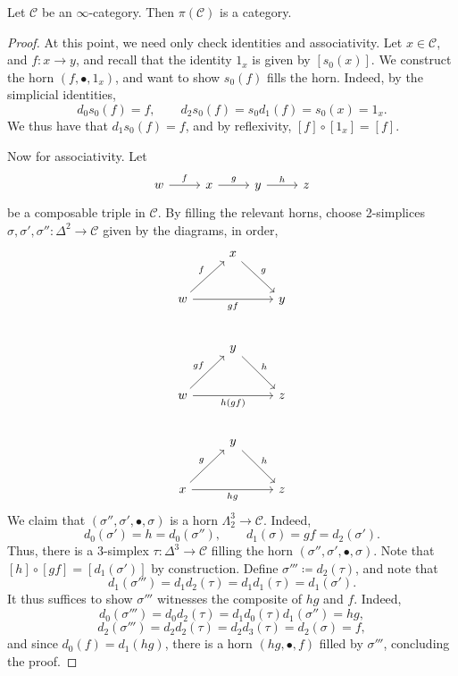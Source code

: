 \begin{proposition}\label{1.2.3.10}
	Let $\mathcal{C} $ be an $\infty $-category. Then $\pi (\mathcal{C} )$ is a category.
\end{proposition}
\begin{proof}
	At this point, we need only check identities and associativity. Let $x\in \mathcal{C} $, and $f : x \to y$, and recall that the identity $1_x$ is given by $[s_0(x)]$. We construct the horn $(f,\bullet,1_x)$, and want to show $s_0(f)$ fills the horn. Indeed, by the simplicial identities,
	\[
		d_0s_0(f)=f,\qquad d_2s_0(f)=s_0d_1(f)=s_0(x)=1_x
	.\]
	We thus have that $d_1s_0(f)=f$, and by reflexivity, $[f]\circ [1_x]=[f]$.

	Now for associativity. Let
	\[\begin{tikzcd}[row sep = 2.5em, column sep = 2.5em]
	w \ar[" f ", r]  & x \ar[" g ", r]  & y \ar[" h ", r]  & z
	\end{tikzcd}\]
	be a composable triple in $\mathcal{C} $. By filling the relevant horns, choose 2-simplices $\sigma ,\sigma ',\sigma '' : \Delta ^2 \to \mathcal{C} $ given by the diagrams, in order,
	\[\begin{tikzcd}[row sep = 2.5em, column sep = 2.5em]
	 & x \ar[" g ", dr]  &  \\
	w \ar[" f ", ur] \ar[" gf "', rr]  &  & y \\
	 & y \ar[" h ", dr]  &  \\
	w \ar[" gf ", ur] \ar[" h(gf) "', rr]  &  & z \\
	 & y \ar[" h ", dr]  &  \\
	x \ar[" g ", ur] \ar[" hg "', rr]  &  & z
	\end{tikzcd}\]
	We claim that $(\sigma'',\sigma ',\bullet,\sigma )$ is a horn $\Lambda ^3_2 \to \mathcal{C} $. Indeed,
	\[
		d_0(\sigma ')=h=d_0(\sigma ''),\qquad d_1(\sigma )=gf=d_2(\sigma ')
	.\]
	Thus, there is a 3-simplex $\tau : \Delta ^3 \to \mathcal{C} $ filling the horn $(\sigma '',\sigma ',\bullet,\sigma )$. Note that $[h]\circ [gf]=[d_1(\sigma ')]$ by construction. Define $\sigma ''' \coloneqq d_2(\tau )$, and note that
	\[
		d_1(\sigma ''')=d_1d_2(\tau )=d_1d_1(\tau )=d_1(\sigma ')
	.\]
	It thus suffices to show $\sigma '''$ witnesses the composite of $hg$ and $f$. Indeed,
	\[
		d_0(\sigma ''')=d_0d_2(\tau )=d_1d_0(\tau )d_1(\sigma'')=hg,
	\]
	\[
		d_2(\sigma ''')=d_2d_2(\tau )=d_2d_3(\tau )=d_2(\sigma )=f,
	\]
	and since $d_0(f)=d_1(hg)$, there is a horn $(hg,\bullet,f)$ filled by $\sigma '''$, concluding the proof.
\end{proof}



